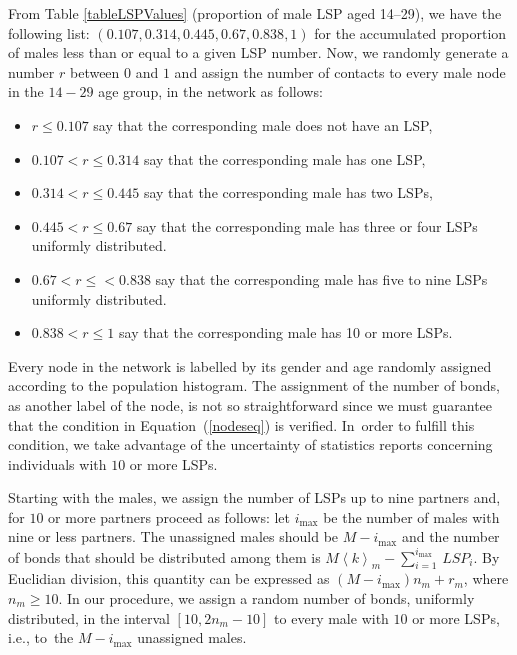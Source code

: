 From Table \ref{tableLSPValues} (proportion of male LSP aged 14--29), we have the following list:
$( 0.107, 0.314, 0.445, 0.67, 0.838, 1)$ for the accumulated proportion of males less than or equal to a given LSP number.
Now, we randomly generate a number $r$ between $0$ and $1$ and assign the number of contacts to every male node in the $14-29$
age group, in the network as follows:

\begin{itemize}[leftmargin=*,labelsep=5mm]
\item $r \le 0.107$ say that the corresponding male does not have an LSP,
\item $0.107 < r \le 0.314$ say that the corresponding male has one LSP,
\item $0.314 < r \le 0.445$ say that the corresponding male has two LSPs,
\item $0.445 < r \le 0.67$  say that the corresponding male has three or four LSPs uniformly distributed.
\item $0.67 < r \le < 0.838$ say that the corresponding male has five to nine LSPs uniformly distributed.
\item $0.838 < r \le 1$ say that the corresponding male has 10 or more LSPs.
\end{itemize}

Every node in the network is labelled by its gender and age randomly assigned according to the population histogram. The assignment of the number of bonds, as another label of the node, is not so straightforward since we must guarantee that the condition in Equation\ (\ref{nodeseq}) is verified. In~order to fulfill this condition, we take advantage of the uncertainty of statistics reports concerning individuals with $10$ or more LSPs.

Starting with the males, we assign the number of LSPs up to nine partners and, for $10$ or more partners proceed as follows: let $i_{\mbox{max}}$ be the number of males with nine or less partners. The unassigned males should be $M-i_{\mbox{max}}$ and the number of bonds that should be distributed among them is $M \left\langle k \right\rangle_m-\sum_{i=1}^{i_{\mbox{max}}}\, LSP_i$. By Euclidian division, this quantity can be expressed as $(M-i_{\mbox{max}}) n_m+r_m$, where $n_m \ge 10$. In our procedure, we assign a random number of bonds, uniformly distributed, in the interval $\left[10,2 n_m-10\right]$ to every male with $10$ or more LSPs, i.e.,
to~the $M-i_{\mbox{max}}$ unassigned males.

